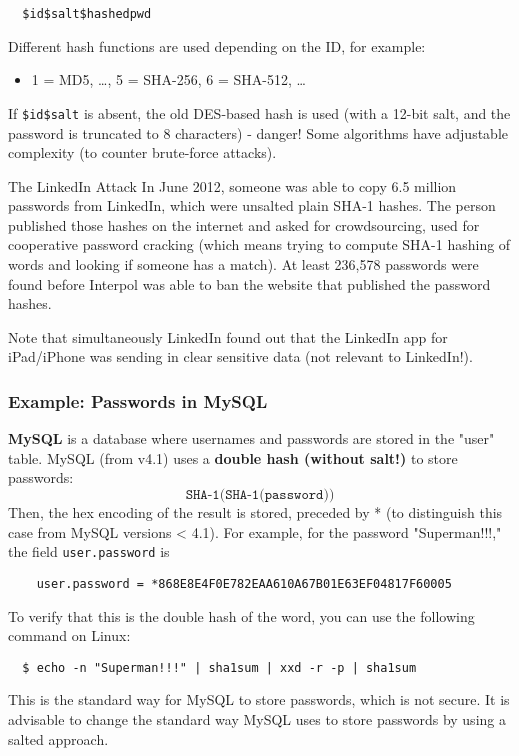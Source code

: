 \begin{verbatim}
  $id$salt$hashedpwd
\end{verbatim}
Different hash functions are used depending on the ID, for example:
\begin{itemize}
  \item 1 = MD5, \ldots, 5 = SHA-256, 6 = SHA-512, \ldots
\end{itemize}
If \texttt{\$id\$salt} is absent, the old DES-based hash is used (with
a 12-bit salt, and the password is truncated to 8 characters) - danger!
Some algorithms have adjustable complexity (to counter brute-force attacks).


\begin{casehistory}{The LinkedIn Attack}
  In June 2012, someone was able to copy 6.5 million passwords from LinkedIn, which were unsalted plain SHA-1
  hashes. The person published those hashes on the internet and asked for crowdsourcing, used for cooperative
  password cracking (which means trying to compute SHA-1 hashing of words and looking if someone has a match).
  At least 236,578 passwords were found before Interpol was able to ban the website that published the
  password hashes.

  Note that simultaneously LinkedIn found out that the LinkedIn app for iPad/iPhone was sending in clear sensitive data
  (not relevant to LinkedIn!).
\end{casehistory}

\subsubsection*{Example: Passwords in MySQL}
\textbf{MySQL} is a database where usernames and passwords are stored in the "user" table. MySQL (from v4.1) uses a \textbf{double hash (without salt!)} to store passwords:
\[
  \texttt{SHA-1(SHA-1(password))}
\]
Then, the hex encoding of the result is stored, preceded by * (to distinguish this case from MySQL versions < 4.1). For example, for the password "Superman!!!," the field \texttt{user.password} is
\begin{verbatim}
    user.password = *868E8E4F0E782EAA610A67B01E63EF04817F60005
\end{verbatim}
To verify that this is the double hash of the word, you can use the following command on Linux:
\begin{verbatim}
  $ echo -n "Superman!!!" | sha1sum | xxd -r -p | sha1sum
\end{verbatim}
This is the standard way for MySQL to store passwords, which is not secure. It is advisable to change the standard way MySQL uses to store passwords by using a salted approach.


